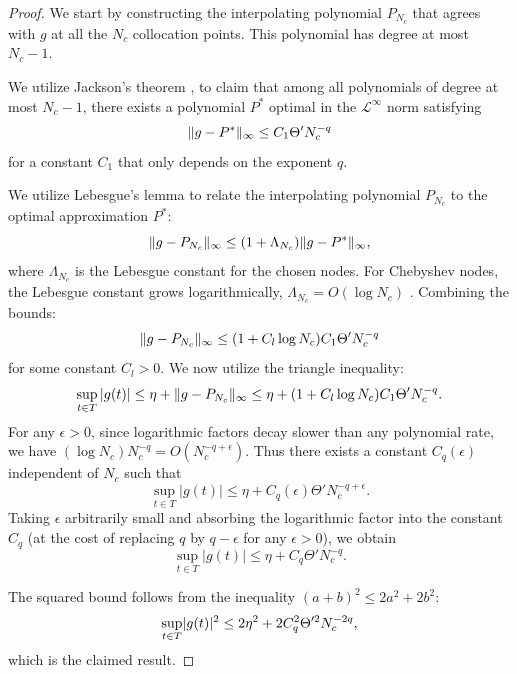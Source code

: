\documentclass[11pt, a4paper]{article}
\theoremstyle{theoremstyle}
\theoremstyle{definitionstyle}
\DeclarePairedDelimiter{\norm}{\lVert}{\rVert}
\DeclarePairedDelimiter{\abs}{\lvert}{\rvert}
\begin{document}
\begin{proof}
    We start by constructing the interpolating polynomial $P_{N_c}$ that agrees with $g$ at all the $N_c$ collocation points. This polynomial has degree at most $N_c - 1$.
    
    We utilize Jackson's theorem \cite{devore1993constructive}, to claim that among all polynomials of degree at most $N_c - 1$, there exists a polynomial $P^*$ optimal in the $\mathcal L^\infty$ norm satisfying
    \begin{equation}
        \norm{g - P^*}_\infty \leq C_1 \Theta' N_c^{-q}
    \end{equation}
    for a constant $C_1$ that only depends on the exponent $q$.

    We utilize Lebesgue's lemma \cite{devore1993constructive} to relate the interpolating polynomial $P_{N_c}$ to the optimal approximation $P^*$:
    \begin{equation}
        \norm{g - P_{N_c}}_{\infty} \leq (1 + \Lambda_{N_c})\norm{g - P^*}_\infty,
    \end{equation} 
    where $\Lambda_{N_c}$ is the Lebesgue constant for the chosen nodes. For Chebyshev nodes, the Lebesgue constant grows logarithmically, $\Lambda_{N_c} = O(\log N_c)$ \cite{BOS20137}. Combining the bounds:
    \begin{equation}
        \norm{g - P_{N_c}}_{\infty} \leq (1 + C_l\log N_c) C_1\Theta' N_c^{-q}
    \end{equation}
    for some constant $C_l > 0$. We now utilize the triangle inequality:
    \begin{equation}
        \sup_{t \in T} |g(t)| \leq \eta + \norm{g - P_{N_c}}_\infty \leq \eta + (1 + C_l\log N_c) C_1\Theta' N_c^{-q}.
    \end{equation}
    For any $\epsilon > 0$, since logarithmic factors decay slower than any polynomial rate, we have $(\log N_c) N_c^{-q} = O(N_c^{-q+\epsilon})$. Thus there exists a constant $C_q(\epsilon)$ independent of $N_c$ such that
    \begin{equation}
        \sup_{t \in T}|g(t)| \leq \eta + C_q(\epsilon)\Theta' N_c^{-q+\epsilon}.
    \end{equation}
    Taking $\epsilon$ arbitrarily small and absorbing the logarithmic factor into the constant $C_q$ (at the cost of replacing $q$ by $q - \epsilon$ for any $\epsilon > 0$), we obtain
    \begin{equation}\label{eq:g_bound}
        \sup_{t \in T}|g(t)| \leq \eta + C_q\Theta' N_c^{-q}.
    \end{equation}
    
    The squared bound follows from the inequality $(a+b)^2 \leq 2a^2 + 2b^2$:
    \begin{equation}
        \sup_{t \in T} \abs{g(t)}^2 \leq 2\eta^2 + 2C_q^2\Theta'^2 N_c^{-2q},
    \end{equation}
    which is the claimed result.
\end{proof}
\end{document}
